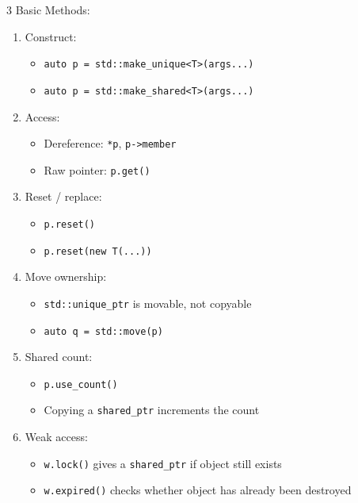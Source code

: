 \documentclass[12pt, a4paper]{article}
\begin{document}
\begin{multicols*}{3}
Basic Methods:
\begin{enumerate}[\roman*.]
  \item Construct:
    \begin{itemize}[leftmargin=*]\vspace{3pt}
      \item \lstinline|auto p = std::make_unique<T>(args...)|
      \item \lstinline|auto p = std::make_shared<T>(args...)|
    \end{itemize}
  \item Access:
    \begin{itemize}[leftmargin=*]\vspace{3pt}
      \item Dereference: \lstinline|*p|, \lstinline|p->member|
      \item Raw pointer: \lstinline|p.get()|
    \end{itemize}
  \item Reset / replace:
    \begin{itemize}[leftmargin=*]\vspace{3pt}
      \item \lstinline|p.reset()|
      \item \lstinline|p.reset(new T(...))|
    \end{itemize}
  \item Move ownership:
    \begin{itemize}[leftmargin=*]\vspace{3pt}
      \item \lstinline|std::unique_ptr| is movable, not copyable
      \item \lstinline|auto q = std::move(p)|
    \end{itemize}
  \item Shared count:
    \begin{itemize}[leftmargin=*]\vspace{3pt}
      \item \lstinline|p.use_count()|
      \item Copying a \lstinline|shared_ptr| increments the count
    \end{itemize}
  \item Weak access:
    \begin{itemize}[leftmargin=*]\vspace{3pt}
      \item \lstinline|w.lock()| gives a \lstinline|shared_ptr| if object still exists
      \item \lstinline|w.expired()| checks whether object has already been destroyed

\end{itemize}
\end{enumerate}
\end{multicols*}
\end{document}
